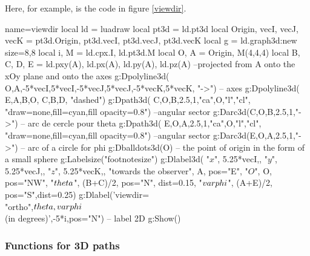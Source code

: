 Here, for example, is the code in figure \ref{viewdir}.

\begin{Luacode}
\begin{luadraw}{name=viewdir}
local ld = luadraw
local pt3d = ld.pt3d
local Origin, vecI, vecJ, vecK = pt3d.Origin, pt3d.vecI, pt3d.vecJ, pt3d.vecK 
local g = ld.graph3d:new{ size={8,8} }
local i, M = ld.cpx.I, ld.pt3d.M
local O, A = Origin, M(4,4,4)
local B, C, D, E = ld.pxy(A), ld.px(A), ld.py(A), ld.pz(A) --projected from A onto the xOy plane and onto the axes
g:Dpolyline3d( {{O,A},{-5*vecI,5*vecI},{-5*vecJ,5*vecJ},{-5*vecK,5*vecK}}, "->") -- axes
g:Dpolyline3d( {{E,A,B,O}, {C,B,D}}, "dashed")
g:Dpath3d( {C,O,B,2.5,1,"ca",O,"l","cl"}, "draw=none,fill=cyan,fill opacity=0.8") --angular sector
g:Darc3d(C,O,B,2.5,1,"->") -- arc de cercle pour theta
g:Dpath3d( {E,O,A,2.5,1,"ca",O,"l","cl"}, "draw=none,fill=cyan,fill opacity=0.8") --angular sector
g:Darc3d(E,O,A,2.5,1,"->") -- arc of a circle for phi
g:Dballdots3d(O) -- the point of origin in the form of a small sphere
g:Labelsize("footnotesize")
g:Dlabel3d(
  "$x$", 5.25*vecI,{}, "$y$", 5.25*vecJ,{}, "$z$", 5.25*vecK,{},
  "towards the observer", A, {pos="E"},
  "$O$", O, {pos="NW"},
  "$\\theta$", (B+C)/2, {pos="N", dist=0.15},
  "$\\varphi$", (A+E)/2, {pos="S",dist=0.25})
g:Dlabel('viewdir=\\{"ortho",$\\theta,\\varphi$\\} (in degrees)',-5*i,{pos="N"}) -- label 2D
g:Show()
\end{luadraw}      
\end{Luacode}

\subsubsection{Functions for 3D paths}

